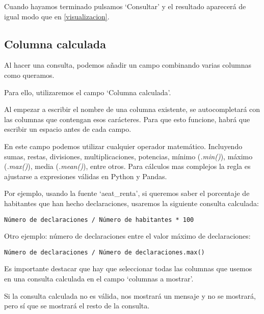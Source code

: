 
Cuando hayamos terminado pulsamos `Consultar' y el resultado aparecerá de igual modo que en \ref{visualizacion}.

\subsection{Columna calculada} \label{calculada}

Al hacer una consulta, podemos añadir un campo combinando varias columnas como queramos.

Para ello, utilizaremos el campo `Columna calculada'.

Al empezar a escribir el nombre de una columna existente, se autocompletará con las columnas que contengan esos carácteres. Para que esto funcione, habrá que escribir un espacio antes de cada campo.


En este campo podemos utilizar cualquier operador matemático. Incluyendo sumas, restas, divisiones, multiplicaciones, potencias, mínimo (\textit{.min()}), máximo (\textit{.max()}), media (\textit{.mean()}), entre otros. Para cálculos mas complejos la regla es ajustarse a expresiones válidas en Python y Pandas.

Por ejemplo, usando la fuente `aeat\_renta', si queremos saber el porcentaje de habitantes que han hecho declaraciones, usaremos la siguiente consulta calculada:

\begin{lstlisting}
Número de declaraciones / Número de habitantes * 100
\end{lstlisting}



Otro ejemplo: número de declaraciones entre el valor máximo de declaraciones:

\begin{lstlisting}
Número de declaraciones / Número de declaraciones.max()
\end{lstlisting}

Es importante destacar que hay que seleccionar todas las columnas que usemos en una consulta calculada en el campo `columnas a mostrar'.

Si la consulta calculada no es válida, nos mostrará un mensaje y no se mostrará, pero sí que se mostrará el resto de la consulta.

